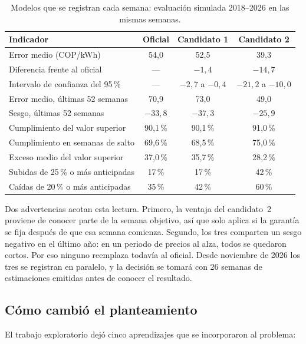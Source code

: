 \documentclass[11pt,letterpaper]{article}
\begin{document}
\begin{table}[H]
\centering
\caption{Modelos que se registran cada semana: evaluación simulada
2018--2026 en las mismas semanas.}
\label{tab:comparacion}
\small
\begin{tabular}{@{}lccc@{}}
\toprule
\textbf{Indicador} & \textbf{Oficial} & \textbf{Candidato 1} & \textbf{Candidato 2} \\
\midrule
Error medio (COP/kWh) & 54,0 & 52,5 & 39,3 \\
Diferencia frente al oficial & --- & $-1{,}4$ & $-14{,}7$ \\
\quad Intervalo de confianza del 95\,\% & --- & $-2{,}7$ a $-0{,}4$ & $-21{,}2$ a $-10{,}0$ \\
Error medio, últimas 52 semanas & 70,9 & 73,0 & 49,0 \\
Sesgo, últimas 52 semanas & $-33{,}8$ & $-37{,}3$ & $-25{,}9$ \\
Cumplimiento del valor superior & 90,1\,\% & 90,1\,\% & 91,0\,\% \\
Cumplimiento en semanas de salto & 69,6\,\% & 68,5\,\% & 75,0\,\% \\
Exceso medio del valor superior & 37,0\,\% & 35,7\,\% & 28,2\,\% \\
Subidas de 25\,\% o más anticipadas & 17\,\% & 17\,\% & 42\,\% \\
Caídas de 20\,\% o más anticipadas & 35\,\% & 42\,\% & 60\,\% \\
\bottomrule
\end{tabular}
\end{table}

Dos advertencias acotan esta lectura. Primero, la ventaja del candidato~2
proviene de conocer parte de la semana objetivo, así que solo aplica si la
garantía se fija después de que esa semana comienza. Segundo, los tres
comparten un sesgo negativo en el último año: en un periodo de precios al
alza, todos se quedaron cortos. Por eso ninguno reemplaza todavía al
oficial. Desde noviembre de 2026 los tres se registran en paralelo, y la
decisión se tomará con 26 semanas de estimaciones emitidas antes de
conocer el resultado.

\subsection{Cómo cambió el planteamiento}

El trabajo exploratorio dejó cinco aprendizajes que se incorporaron al
problema:
\end{document}
